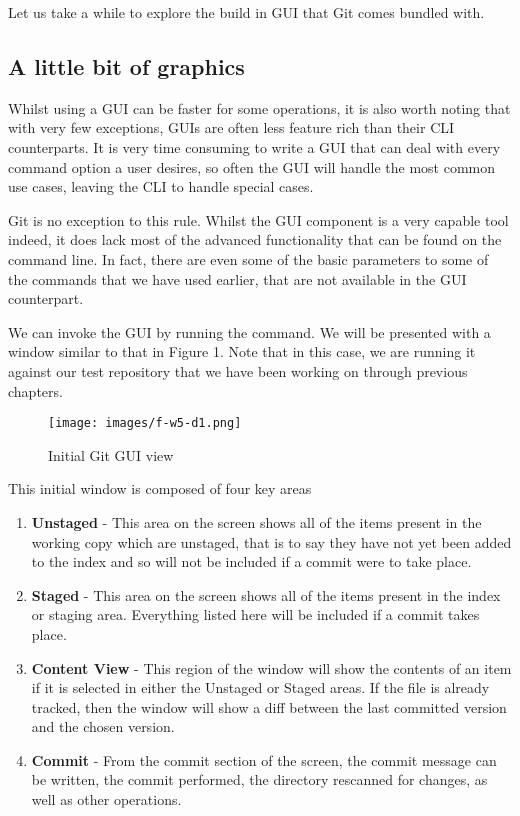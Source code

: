 Let us take a while to explore the build in GUI that Git comes bundled with.

\subsection{A little bit of graphics}
Whilst using a GUI can be faster for some operations, it is also worth noting that with very few exceptions, GUIs are often less feature rich than their CLI counterparts.  It is very time consuming to write a GUI that can deal with every command option a user desires, so often the GUI will handle the most common use cases, leaving the CLI to handle special cases.

Git is no exception to this rule.  Whilst the GUI component is a very capable tool indeed, it does lack most of the advanced functionality that can be found on the command line.  In fact, there are even some of the basic parameters to some of the commands that we have used earlier, that are not available in the GUI counterpart.

We can invoke the GUI by running the  command.  We will be presented with a window similar to that in Figure 1.  Note that in this case, we are running it against our test repository that we have been working on through previous chapters.

\begin{figure}[hbt]
\centering
\texttt{[image: images/f-w5-d1.png]}
\caption{Initial Git GUI view}
\end{figure}

This initial window is composed of four key areas
\begin{enumerate}
\item \textbf{Unstaged} - This area on the screen shows all of the items present in the working copy which are unstaged, that is to say they have not yet been added to the index and so will not be included if a commit were to take place.
\item \textbf{Staged} - This area on the screen shows all of the items present in the index or staging area.  Everything listed here will be included if a commit takes place.
\item \textbf{Content View} - This region of the window will show the contents of an item if it is selected in either the Unstaged or Staged areas.  If the file is already tracked, then the window will show a diff between the last committed version and the chosen version.
\item \textbf{Commit} - From the commit section of the screen, the commit message can be written, the commit performed, the directory rescanned for changes, as well as other operations.
\end{enumerate}

